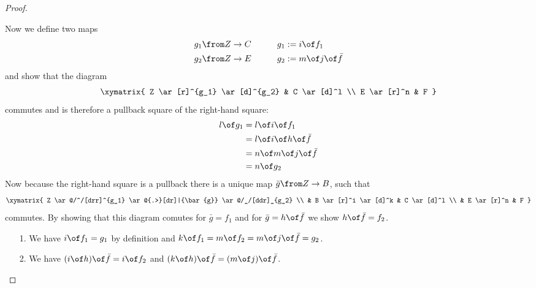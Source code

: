 \begin{answer}
\begin{proof}
\begin{itemize}
        Now we define two maps
        \begin{alignat*}{4}
          g_1 &\from Z \to C&  \qquad g_1 &:= i \of f_1 \\
          g_2 &\from Z \to E&         g_2 &:= m \of j \of \bar{f}
        \end{alignat*}
        and show that the diagram
        \[ \xymatrix{
          Z \ar[r]^{g_1} \ar[d]^{g_2} & C \ar[d]^l \\
          E \ar[r]^n & F
        } \]
        commutes and is therefore a pullback square of the right-hand square:
        \begin{alignat*}{2}
          l \of g_1
          &= l \of i \of f_1 \\
          &= l \of i \of h \of \bar{f} \\
          &= n \of m \of j \of \bar{f} \\
          &= n \of g_2
        \end{alignat*}
        Now because the right-hand square is a pullback there is a unique map $\bar{g} \from Z \to B$, such that
        \[ \xymatrix{
          Z \ar@/^/[drr]^{g_1}
            \ar@{.>}[dr]|{\bar{g}}
            \ar@/_/[ddr]_{g_2} \\
          & B \ar[r]^i \ar[d]^k & C \ar[d]^l \\
          & E \ar[r]^n & F
        } \]
        commutes.
        By showing that this diagram comutes for $\bar{g} = f_1$ and for $\bar{g} = h \of \bar{f}$ we show $h \of \bar{f} = f_2$.
        \begin{itemize}
          \item[1.]We have $i \of f_1 = g_1$ by definition and $k \of f_1 = m \of f_2 = m \of j \of \bar{f} = g_2$.
          \item[2.]We have $(i \of h) \of \bar{f} = i \of f_2$ and $(k \of h) \of \bar{f} = (m \of j) \of \bar{f}$.
        \end{itemize}


\end{itemize}
\end{proof}
\end{answer}
